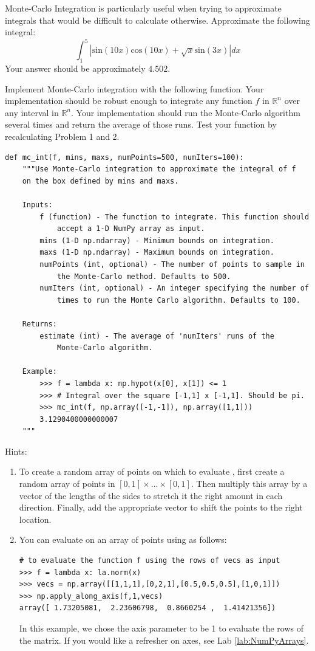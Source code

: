 \begin{problem}
\label{prob:crazy_sine}
Monte-Carlo Integration is particularly useful when trying to approximate integrals that would be difficult to calculate otherwise. Approximate the following integral:
$$\int_{1}^{5} \left | \text{sin}(10x)\text{cos}(10x) + \sqrt{x}\text{sin}(3x) \right | dx$$
Your answer should be approximately $4.502$.
\end{problem}

\begin{problem}
\label{prob:mc}
Implement Monte-Carlo integration with the following function. Your implementation should be robust enough to integrate any function $f$ in $\mathbb{R}^n$ over any interval in $\mathbb{R}^n$.
Your implementation should run the Monte-Carlo algorithm several times
and return the average of those runs. Test your function by recalculating Problem 1 and 2.
\begin{lstlisting}
def mc_int(f, mins, maxs, numPoints=500, numIters=100):
    """Use Monte-Carlo integration to approximate the integral of f
    on the box defined by mins and maxs.

    Inputs:
        f (function) - The function to integrate. This function should
            accept a 1-D NumPy array as input.
        mins (1-D np.ndarray) - Minimum bounds on integration.
        maxs (1-D np.ndarray) - Maximum bounds on integration.
        numPoints (int, optional) - The number of points to sample in
            the Monte-Carlo method. Defaults to 500.
        numIters (int, optional) - An integer specifying the number of
            times to run the Monte Carlo algorithm. Defaults to 100.

    Returns:
        estimate (int) - The average of 'numIters' runs of the
            Monte-Carlo algorithm.

    Example:
        >>> f = lambda x: np.hypot(x[0], x[1]) <= 1
        >>> # Integral over the square [-1,1] x [-1,1]. Should be pi.
        >>> mc_int(f, np.array([-1,-1]), np.array([1,1]))
        3.1290400000000007
    """
\end{lstlisting}

Hints:
\begin{enumerate}
\item To create a random array of points on which to evaluate , first create a random array of points in $[0,1] \times \ldots \times [0,1]$.
Then multiply this array by a vector of the lengths of the sides to stretch it the right amount in each direction.
Finally, add the appropriate vector to shift the points to the right location.
\item You can evaluate  on an array of points using  as follows:
\begin{lstlisting}
# to evaluate the function f using the rows of vecs as input
>>> f = lambda x: la.norm(x)
>>> vecs = np.array([[1,1,1],[0,2,1],[0.5,0.5,0.5],[1,0,1]])
>>> np.apply_along_axis(f,1,vecs)
array([ 1.73205081,  2.23606798,  0.8660254 ,  1.41421356])
\end{lstlisting}
In this example, we chose the axis parameter to be 1 to evaluate the rows of the matrix. If you would like a refresher on axes, see Lab \ref{lab:NumPyArrays}.


\end{enumerate}
\end{problem}
